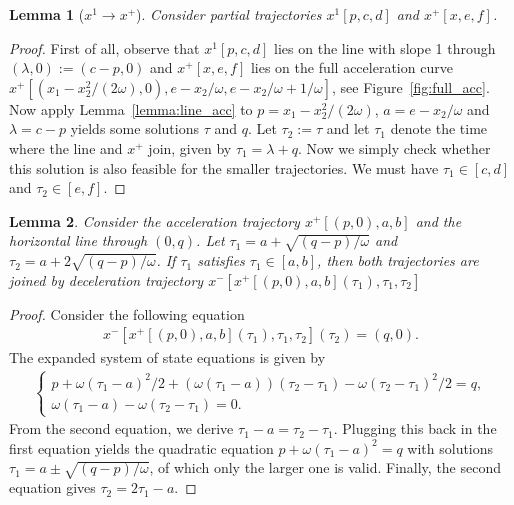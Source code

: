 \documentclass[a4paper]{article}
\theoremstyle{definition}
\theoremstyle{plain}
\newtheorem{lemma}{Lemma}
\begin{document}
\begin{lemma}[$x^{1} \rightarrow x^{+}$]
Consider partial trajectories $x^{1}[p, c, d]$ and $x^{+}[x, e, f]$.
\end{lemma}
\begin{proof}
  First of all, observe that $x^{1}[p, c, d]$ lies on the line with slope 1
  through $(\lambda, 0) := (c - p, 0)$ and $x^{+}[x, e, f]$ lies on the full
  acceleration curve
  $x^{+}[(x_{1} - x_{2}^{2}/(2\omega) , 0), e - x_{2}/\omega, e - x_{2}/\omega + 1/\omega]$, see
  Figure~\ref{fig:full_acc}.
  Now apply Lemma~\ref{lemma:line_acc} to $p = x_{1} - x_{2}^{2}/(2\omega)$,
  $a = e - x_{2}/\omega$ and $\lambda = c - p$ yields some solutions $\tau$ and $q$.
  Let $\tau_{2} := \tau$ and let $\tau_{1}$ denote the time where the line and
  $x^{+}$ join, given by $\tau_{1} = \lambda + q$. Now we simply check whether this
  solution is also feasible for the smaller trajectories. We must have
  $\tau_{1} \in [c, d]$ and $\tau_{2} \in [e, f]$.
\end{proof}


\begin{lemma}
  \label{lemma:acc_hline}
  Consider the acceleration trajectory $x^{+}[(p, 0), a, b]$ and the horizontal
  line through $(0, q)$. Let $\tau_{1} = a + \sqrt{(q-p)/\omega}$ and
  $\tau_{2} = a + 2\sqrt{(q-p)/\omega}$. If $\tau_{1}$ satisfies
  $\tau_{1} \in [a, b]$, then both trajectories are joined by deceleration
  trajectory $x^{-}[x^{+}[(p, 0), a, b](\tau_{1}), \tau_{1}, \tau_{2}]$
\end{lemma}
\begin{proof}
  Consider the following equation
  \begin{align*}
    x^{-}[x^{+}[(p, 0),a,b](\tau_{1}), \tau_{1}, \tau_{2}](\tau_{2}) = (q, 0) .
  \end{align*}
  The expanded system of state equations is given by
  \begin{align*}
    \begin{cases}
      p + \omega (\tau_{1} - a)^{2}/2 + (\omega(\tau_{1} - a)) (\tau_{2} - \tau_{1}) - \omega(\tau_{2} - \tau_{1})^{2}/2 = q , \\
      \omega(\tau_{1} - a) - \omega(\tau_{2} - \tau_{1}) = 0 .
    \end{cases}
  \end{align*}
  From the second equation, we derive $\tau_{1} - a = \tau_{2} - \tau_{1}$.
  Plugging this back in the first equation yields the quadratic equation
  $p + \omega(\tau_{1} - a)^{2} = q$ with solutions
  $\tau_{1} = a \pm \sqrt{(q-p)/\omega}$, of which only the larger one is valid.
  Finally, the second equation gives $\tau_{2} = 2\tau_{1} - a$.
\end{proof}
\end{document}
